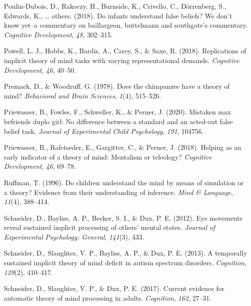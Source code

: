 \documentclass[
  english,
  man,floatsintext]{apa6}
\newlength{\cslhangindent}
\newlength{\cslentryspacingunit} %
\newenvironment{CSLReferences}[2] %
 {%
  \setlength{\parindent}{0pt}
  \ifodd #1
  \let\oldpar\par
  \def\par{\hangindent=\cslhangindent\oldpar}
  \fi
  \setlength{\parskip}{#2\cslentryspacingunit}
 }%
 {}
\begin{document}
\begin{CSLReferences}{1}{0}
\leavevmode{}%
Poulin-Dubois, D., Rakoczy, H., Burnside, K., Crivello, C., Dörrenberg, S., Edwards, K., \ldots{} others. (2018). Do infants understand false beliefs? We don't know yet--a commentary on baillargeon, buttelmann and southgate's commentary. \emph{Cognitive Development}, \emph{48}, 302--315.

\leavevmode{}%
Powell, L. J., Hobbs, K., Bardis, A., Carey, S., \& Saxe, R. (2018). Replications of implicit theory of mind tasks with varying representational demands. \emph{Cognitive Development}, \emph{46}, 40--50.

\leavevmode{}%
Premack, D., \& Woodruff, G. (1978). Does the chimpanzee have a theory of mind? \emph{Behavioral and Brain Sciences}, \emph{1}(4), 515--526.

\leavevmode{}%
Priewasser, B., Fowles, F., Schweller, K., \& Perner, J. (2020). Mistaken max befriends duplo girl: No difference between a standard and an acted-out false belief task. \emph{Journal of Experimental Child Psychology}, \emph{191}, 104756.

\leavevmode{}%
Priewasser, B., Rafetseder, E., Gargitter, C., \& Perner, J. (2018). Helping as an early indicator of a theory of mind: Mentalism or teleology? \emph{Cognitive Development}, \emph{46}, 69--78.

\leavevmode{}%
Ruffman, T. (1996). Do children understand the mind by means of simulation or a theory? Evidence from their understanding of inference. \emph{Mind \& Language}, \emph{11}(4), 388--414.

\leavevmode{}%
Schneider, D., Bayliss, A. P., Becker, S. I., \& Dux, P. E. (2012). Eye movements reveal sustained implicit processing of others' mental states. \emph{Journal of Experimental Psychology: General}, \emph{141}(3), 433.

\leavevmode{}%
Schneider, D., Slaughter, V. P., Bayliss, A. P., \& Dux, P. E. (2013). A temporally sustained implicit theory of mind deficit in autism spectrum disorders. \emph{Cognition}, \emph{129}(2), 410--417.

\leavevmode{}%
Schneider, D., Slaughter, V. P., \& Dux, P. E. (2017). Current evidence for automatic theory of mind processing in adults. \emph{Cognition}, \emph{162}, 27--31.


\end{CSLReferences}
\end{document}
